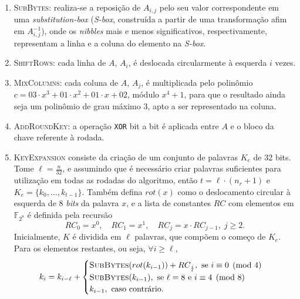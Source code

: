 \documentclass[12pt]{report}
\begin{document}
\begin{enumerate}[label=\roman*.]

  \item \textsc{SubBytes}: realiza-se a reposição de $A_{i,j}$ pelo seu valor
      correspondente em uma \emph{substitution-box} (\emph{S-box}, construída a
        partir de uma transformação afim em $A_{i,j}^{-1}$),
        onde os \emph{nibbles} mais e menos significativos,
        respectivamente, representam a linha e a coluna do elemento na
        \emph{S-box}.

  \item \textsc{ShiftRows}: cada linha de $A$, $A_i$, é deslocada circularmente
      à esquerda $i$ vezes.

  \item \textsc{MixColumns}: cada coluna de $A$, $A_j$, é multiplicada pelo
      polinômio $c = 03 \cdot x^{3} + 01 \cdot x^{2} + 01 \cdot x + 02$, módulo
        $x^{4} + 1$, para que o resultado ainda seja um polinômio de grau
        máximo 3, apto a ser representado na coluna.

  \item \textsc{AddRoundKey}: a operação \texttt{XOR} bit a bit é aplicada
      entre $A$ e o bloco da chave referente à rodada.

  \item \textsc{KeyExpansion} consiste da criação de um conjunto de palavras $K_e$ de
32 bits.  Tome $\ell = \frac{n}{32}$, e assumindo que é necessário criar
palavras suficientes para utilização em todas as rodadas do algoritmo, então $t
= \ell \cdot (n_r + 1)$ e $K_e = \{k_0, \dots, k_{t - 1}\}$. Também defina
$rot(x)$ como o deslocamento circular à esquerda de 8 \emph{bits} da palavra $x$, e a
lista de constantes $RC$ com elementos em $\mathbb{F}_{2^{8}}$ é definida pela
recursão 
\begin{equation}
RC_0 = x^0, \quad RC_1 = x^1, \quad RC_j = x \cdot RC_{j-1}, \; j \geq 2.
\end{equation}
Inicialmente, $K$ é dividida em $\ell$ palavras, que compõem o começo de $K_e$.
Para os elementos restantes, ou seja, $\forall i \geq \ell$,
\begin{equation}
  k_{i} = k_{i - \ell} + 
    \begin{cases}
      \textsc{SubBytes}(rot(k_{i - 1})) + RC_{\frac{i}{\ell}},
        \text{ se } i \equiv 0 \pmod{4} \\
      \textsc{SubBytes}(k_{i - 1}),
        \text{ se } \ell = 8 \text { e } i \equiv 4 \pmod{8} \\
      k_{i - 1}, \text{ caso contrário.}
    \end{cases}
\end{equation}
\end{enumerate}
\end{document}
